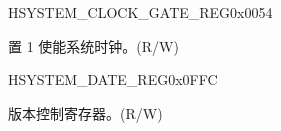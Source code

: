 \begin{register}{H}{SYSTEM\_CLOCK\_GATE\_REG}{0x0054}\label{regdesc:SYSTEMCLOCKGATEREG}
%
%
\regnewline%
\begin{regdesc}\begin{reglist}
\label{fielddesc:SYSTEMCLKEN}\item [SYSTEM\_CLK\_EN] 置 1 使能系统时钟。(R/W)
\end{reglist}\end{regdesc}
\end{register}


\begin{register}{H}{SYSTEM\_DATE\_REG}{0x0FFC}\label{regdesc:SYSTEMDATEREG}
%
%
\regnewline%
\begin{regdesc}\begin{reglist}
\label{fielddesc:SYSTEMDATE}\item [SYSTEM\_DATE] 版本控制寄存器。(R/W)
\end{reglist}\end{regdesc}
\end{register}
